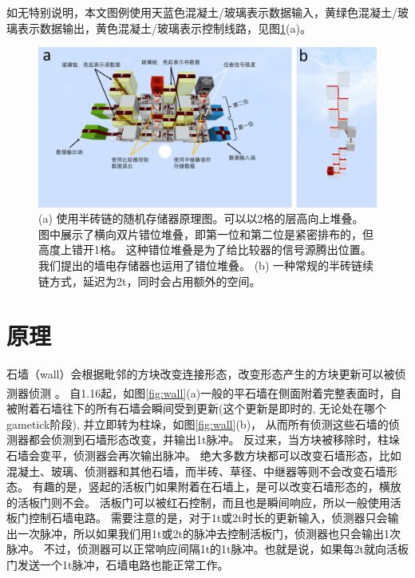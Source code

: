 \documentclass[UTF8,12pt,punct=kaiming,fontset=none]{article}
\newcommand*{\upcite}[1]{
    \textsuperscript{\cite{#1}}
}
\begin{document}
如无特别说明，本文图例使用天蓝色混凝土/玻璃表示数据输入，黄绿色混凝土/玻璃表示数据输出，黄色混凝土/玻璃表示控制线路，见图\ref{fig:normalRAM}(a)。
\begin{figure}[t]
    \centering
    \includegraphics[width=.8\textwidth]{Fig1.pdf}
    \caption{(a) 使用半砖链的随机存储器原理图。可以以2格的层高向上堆叠。
    图中展示了横向双片错位堆叠，即第一位和第二位是紧密排布的，但高度上错开1格。
    这种错位堆叠是为了给比较器的信号源腾出位置。我们提出的墙电存储器也运用了错位堆叠。
    (b) 一种常规的半砖链续链方式，延迟为2t，同时会占用额外的空间。}
    \label{fig:normalRAM}
\end{figure}

\section{原理}
石墙（wall）会根据毗邻的方块改变连接形态，改变形态产生的方块更新可以被侦测器侦测\upcite{Wall}。
自1.16起，如图\ref{fig:wall}(a)一般的平石墙在侧面附着完整表面时，自被附着石墙往下的所有石墙会瞬间受到更新(这个更新是即时的, 无论处在哪个gametick阶段), 并立即转为柱垛，如图\ref{fig:wall}(b)，
从而所有侦测这些石墙的侦测器都会侦测到石墙形态改变，并输出1t脉冲。
反过来，当方块被移除时，柱垛石墙会变平，侦测器会再次输出脉冲。
绝大多数方块都可以改变石墙形态，比如混凝土、玻璃、侦测器和其他石墙，而半砖、草径、中继器等则不会改变石墙形态。
有趣的是，竖起的活板门如果附着在石墙上，是可以改变石墙形态的，横放的活板门则不会。
活板门可以被红石控制，而且也是瞬间响应，所以一般使用活板门控制石墙电路。
需要注意的是，对于1t或2t时长的更新输入，侦测器只会输出一次脉冲，所以如果我们用1t或2t的脉冲去控制活板门，侦测器也只会输出1次脉冲。
不过，侦测器可以正常响应间隔1t的1t脉冲。也就是说，如果每2t就向活板门发送一个1t脉冲，石墙电路也能正常工作。
\end{document}
